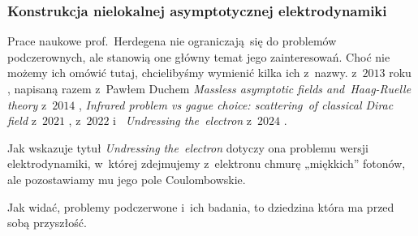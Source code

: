 \documentclass[10pt,t]{beamer}
\begin{document}
\begin{frame}
  \frametitle{Konstrukcja nielokalnej asymptotycznej
    elektrodynamiki}





  Prace naukowe prof.~Herdegena nie ograniczają~się do problemów
  podczerownych, ale stanowią one główny temat jego zainteresowań. Choć nie
  możemy ich omówić tutaj, chcielibyśmy wymienić kilka ich z~nazwy.
   z~$2013$ roku
  \parencite{Herdegen-Infraparticle-Problem-Asymptotic-Fields-ETC-Pub-2013},
  napisaną razem z~Pawłem Duchem 
  {\textit{Massless asymptotic fields and~Haag-Ruelle theory}} z~$2014$
  \parencite{Duch-Herdegen-Massless-asymptotic-fields-and-ETC-Pub-2014},
  {\textit{Infrared problem vs gague choice: scattering~of classical Dirac
      field}} z~$2021$
  \parencite{Herdegen-Infrared-Problem-vs-Gauge-Choice-ETC-Ver-2021},
   z~$2022$
  \parencite{Herdegen-Almost-radial-gauge-ETC-Pub-2022}
  i~
  {\textit{Undressing the~electron}} z~$2024$
  \parencite{Herdegen-Undressing-the-electron-Pub-2024}.

  Jak wskazuje tytuł 
  {\textit{Undressing the~electron}} dotyczy ona problemu wersji
  elektrodynamiki, w~której zdejmujemy z~elektronu chmurę „miękkich”
  fotonów, ale pozostawiamy mu jego pole Coulombowskie.

  Jak widać, problemy podczerwone i~ich badania, to dziedzina która ma
  przed sobą przyszłość.

\end{frame}
\end{document}

